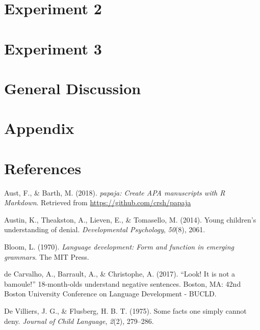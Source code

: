 \documentclass[man,floatsintext]{apa6}
\begin{document}
\hypertarget{experiment-2}{%
\section{Experiment 2}\label{experiment-2}}

\hypertarget{experiment-3}{%
\section{Experiment 3}\label{experiment-3}}

\hypertarget{general-discussion}{%
\section{General Discussion}\label{general-discussion}}

\hypertarget{appendix}{%
\section{Appendix}\label{appendix}}

\newpage

\hypertarget{references}{%
\section{References}\label{references}}

\begingroup
\setlength{\parindent}{-0.5in}
\setlength{\leftskip}{0.5in}

\hypertarget{refs}{}
\leavevmode\hypertarget{ref-R-papaja}{}%
Aust, F., \& Barth, M. (2018). \emph{papaja: Create APA manuscripts with R Markdown}. Retrieved from \url{https://github.com/crsh/papaja}

\leavevmode\hypertarget{ref-austin2014denial}{}%
Austin, K., Theakston, A., Lieven, E., \& Tomasello, M. (2014). Young children's understanding of denial. \emph{Developmental Psychology}, \emph{50}(8), 2061.

\leavevmode\hypertarget{ref-bloom1970language}{}%
Bloom, L. (1970). \emph{Language development: Form and function in emerging grammars}. The MIT Press.

\leavevmode\hypertarget{ref-deCarvalhoEtal2017}{}%
de Carvalho, A., Barrault, A., \& Christophe, A. (2017). ``Look! It is not a bamoule!'' 18-month-olds understand negative sentences. Boston, MA: 42nd Boston University Conference on Language Development - BUCLD.

\leavevmode\hypertarget{ref-deVilliersFlusberg1975}{}%
De Villiers, J. G., \& Flusberg, H. B. T. (1975). Some facts one simply cannot deny. \emph{Journal of Child Language}, \emph{2}(2), 279--286.
\end{document}
